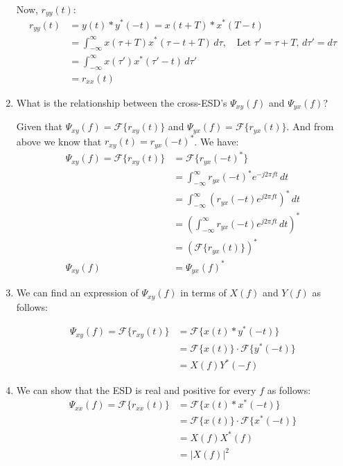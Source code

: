 \documentclass{article}
\begin{document}
\begin{enumerate}[label=2.\arabic*]
    Now, $r_{yy}(t)$:
    \begin{align*}
        r_{yy}(t) &= y(t) \ast y^*(-t) = x(t+T) \ast x^*(T - t) \\
        &= \int_{-\infty}^{\infty} x(\tau + T)x^*(\tau - t + T) \, d\tau, \quad \text {Let } \tau' = \tau + T, \, d\tau' = d\tau \\
        &= \int_{-\infty}^{\infty} x(\tau')x^*(\tau' - t) \, d\tau' \\
        &= r_{xx}(t)
    \end{align*}

    \item What is the relationship between the cross-ESD's $\Psi_{xy}(f)$ and $\Psi_{yx}(f)$?

    Given that $\Psi_{xy}(f) = \mathcal{F}\{r_{xy}(t)\}$ and $\Psi_{yx}(f) = \mathcal{F}\{r_{yx}(t)\}$. And from above we know that $r_{xy}(t) = r_{yx}(-t)^\ast$. We have:
    \begin{align*}
        \Psi_{xy}(f) = \mathcal{F}\{r_{xy}(t)\} &= \mathcal{F}\{r_{yx}(-t)^\ast\} \\
        &= \int_{-\infty}^{\infty} r_{yx}(-t)^\ast e^{-j2\pi ft} \, dt \\
        &= \int_{-\infty}^{\infty} \left(r_{yx}(-t) e^{j2\pi ft}\right)^\ast \, dt \\
        &= \left(\int_{-\infty}^{\infty} r_{yx}(-t) e^{j2\pi ft} \, dt\right)^\ast \\
        &= \left(\mathcal{F}\{r_{yx}(t)\}\right)^\ast \\
       \Psi_{xy}(f) &= \Psi_{yx}(f)^\ast
    \end{align*}

    \item We can find an expression of $\Psi_{xy}(f)$ in terms of $X(f)$ and $Y(f)$ as follows:

    \begin{align*}
        \Psi_{xy}(f) = \mathcal{F}\{r_{xy}(t)\} &= \mathcal{F}\{x(t) \ast y^*(-t)\} \\
        &= \mathcal{F}\{x(t)\} \cdot \mathcal{F}\{y^*(-t)\} \\
        &= X(f)Y^*(-f)
    \end{align*}

    \item We can show that the ESD is real and positive for every $f$ as follows:
    \begin{align*}
        \Psi_{xx}(f) = \mathcal{F}\{r_{xx}(t)\} &= \mathcal{F}\{x(t) \ast x^*(-t)\} \\
        &= \mathcal{F}\{x(t)\} \cdot \mathcal{F}\{x^*(-t)\} \\
        &= X(f)X^*(f) \\
        &= |X(f)|^2
    \end{align*}


\end{enumerate}
\end{document}

